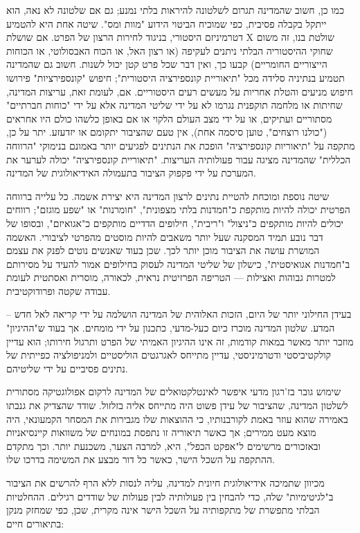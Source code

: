 \documentclass[12pt,oneside]{book}
\begin{document}
כמו כן, חשוב שהמדינה תגרום לשלטונה להיראות בלתי נמנע; גם אם שלטונה לא נאה, הוא ייתקל בקבלה פסיבית, כפי שמוכיח הביטוי הידוע "מוות ומס". שיטה אחת היא להטמיע דטרמיניזם היסטורי, בניגוד לחירות הרצון של הפרט. אם שושלת X שולטת בנו, זה משום שחוקי ההיסטוריה הבלתי ניתנים לעקיפה (או רצון האל, או הכוח האבסולוטי, או הכוחות הייצוריים החומריים) קבעו כך, ואין דבר שכל פרט קטן יכול לשנות. חשוב גם שהמדינה תטמיע בנתיניה סלידה מכל "תיאוריית קונספירציה היסטורית"; חיפוש "קונספירציות" פירושו חיפוש מניעים והטלת אחריות על מעשים רעים היסטוריים. אם, לעומת זאת, עריצות המדינה, שחיתות או מלחמה תוקפנית נגרמו לא על ידי שליטי המדינה אלא על ידי "כוחות חברתיים" מסתוריים ועתיקים, או על ידי מצב העולם הלקוי או אם באופן כלשהו כולם היו אחראים ("כולנו רוצחים", טוען סיסמה אחת), אין טעם שהציבור יתקומם או יזדעזע. יתר על כן, מתקפה על "תיאוריות קונספירציה" הופכת את הנתינים לפגיעים יותר באמונם בנימוקי "הרווחה הכללית" שהמדינה מציגה עבור פעולותיה העריצות. "תיאוריית קונספירציה" יכולה לערער את המערכת על ידי פקפוק הציבור בתעמולה האידיאולוגית של המדינה.

שיטה נוספת ומוכחת להטיית נתינים לרצון המדינה היא יצירת אשמה. כל עלייה ברווחה הפרטית יכולה להיות מותקפת כ"חמדנות בלתי מצפונית", "חומרנות" או "שפע מוגזם"; רווחים יכולים להיות מותקפים כ"ניצול" ו"ריבית", חילופים הדדיים מותקפים כ"אגואיזם", ובסופו של דבר נובע תמיד המסקנה שעל יותר משאבים להיות מוסטים מהפרטי לציבורי. האשמה המושרת עושה את הציבור מוכן יותר לכך. שכן בעוד שאנשים נוטים לפנק את עצמם ב"חמדנות אגואיסטית", כישלון של שליטי המדינה לעסוק בחילופים אמור להעיד על מסירותם למטרות גבוהות ואצילות — הטריפה הפרזיטית נראית, לכאורה, מוסרית ואסתטית לעומת עבודה שקטה ופרודוקטיבית.

בעידן החילוני יותר של היום, הזכות האלוהית של המדינה הושלמה על ידי קריאה לאל חדש – המדע. שלטון המדינה מוכרז כיום כעל-מדעי, כתכנון על ידי מומחים. אך בעוד ש"ההיגיון" מוזכר יותר מאשר במאות קודמות, זה אינו ההיגיון האמיתי של הפרט ותרגול חירותו; הוא עדיין קולקטיביסטי ודטרמיניסטי, עדיין מתייחס לאגרגטים הוליסטיים ולמניפולציה כפייתית של נתינים פסיביים על ידי שליטיהם.

שימוש גובר בז'רגון מדעי איפשר לאינטלקטואלים של המדינה לרקום אפולוגטיקה מסתורית לשלטון המדינה, שהציבור של עידן פשוט היה מתייחס אליה בזלזול. שודד שהצדיק את גנבתו באמירה שהוא עוזר באמת לקורבנותיו, כי ההוצאות שלו מגבירות את המסחר הקמעונאי, היה מוצא מעט ממירים; אך כאשר תיאוריה זו נתפסת במונחים של משוואות קיינסיאניות ובאזכורים מרשימים ל"אפקט הכפל", היא, למרבה הצער, משכנעת יותר. וכך מתקדם ההתקפה על השכל הישר, כאשר כל דור מבצע את המשימה בדרכו שלו.

מכיוון שתמיכה אידיאולוגית חיונית למדינה, עליה לנסות ללא הרף להרשים את הציבור ב"לגיטימיות" שלה, כדי להבחין בין פעולותיה לבין פעולות של שודדים רגילים. ההחלטיות הבלתי מתפשרת של מתקפותיה על השכל הישר אינה מקרית, שכן, כפי שמחזק מנקן בתיאורים חיים: \\
\end{document}
